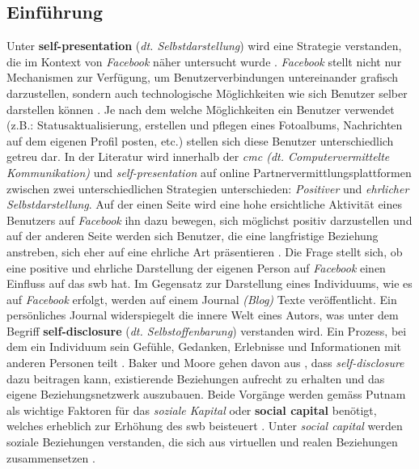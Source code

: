\subsection{Einführung}\label{subsec.selfpEinführung}
Unter \textbf{self-presentation} (\textit{dt. Selbstdarstellung}) wird eine Strategie verstanden, die im Kontext von \textit{Facebook} näher untersucht wurde \cite{Kim:2011}. \textit{Facebook} stellt nicht nur Mechanismen zur Verfügung, um Benutzerverbindungen untereinander grafisch darzustellen, sondern auch technologische Möglichkeiten wie sich Benutzer selber darstellen können \cite{Ellison:2007.1}. Je nach dem welche Möglichkeiten ein Benutzer verwendet (z.B.: Statusaktualisierung, erstellen und pflegen eines Fotoalbums, Nachrichten auf dem eigenen Profil posten, etc.) stellen sich diese Benutzer unterschiedlich getreu dar. In der Literatur wird innerhalb der \textit{\gls{cmc} (dt. Computervermittelte Kommunikation)} \cite{Tidwell:2002} und \textit{self-presentation} auf online Partnervermittlungsplattformen \cite{Gibbs:2006} zwischen zwei unterschiedlichen Strategien unterschieden: \textit{Positiver} und \textit{ehrlicher Selbstdarstellung}. Auf der einen Seite wird eine hohe ersichtliche Aktivität eines Benutzers auf \textit{Facebook} ihn dazu bewegen, sich möglichst positiv darzustellen \cite{Kimmerle:2008} und auf der anderen Seite werden sich Benutzer, die eine langfristige Beziehung anstreben, sich eher auf eine ehrliche Art präsentieren \cite{Gibbs:2006}. Die Frage stellt sich, ob eine positive und ehrliche Darstellung der eigenen Person auf \textit{Facebook} einen Einfluss auf das \gls{swb} hat.\newline
Im Gegensatz zur Darstellung eines Individuums, wie es auf \textit{Facebook} erfolgt, werden auf einem Journal \textit{(Blog)} Texte veröffentlicht. Ein persönliches Journal widerspiegelt die innere Welt eines Autors, was unter dem Begriff \textbf{self-disclosure} (\textit{dt. Selbstoffenbarung}) verstanden wird. Ein Prozess, bei dem ein Individuum sein Gefühle, Gedanken, Erlebnisse und Informationen mit anderen Personen teilt \cite{Derlega:1993}. Baker und Moore gehen davon aus \cite{Baker:2008}, dass \textit{self-disclosure} dazu beitragen kann, existierende Beziehungen aufrecht zu erhalten und das eigene Beziehungsnetzwerk auszubauen. Beide Vorgänge werden gemäss Putnam \cite{Putnam:2000} als wichtige Faktoren für das \textit{soziale Kapital} oder \textbf{social capital} benötigt, welches erheblich zur Erhöhung des \gls{swb} beisteuert \cite{Sirgy:2006}. Unter \textit{social capital} werden soziale Beziehungen verstanden, die sich aus virtuellen und realen Beziehungen zusammensetzen \cite{Ellison:2007}.
